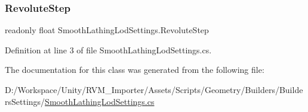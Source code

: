 \subsubsection{\texorpdfstring{RevoluteStep}{RevoluteStep}}
{\footnotesize\ttfamily readonly float Smooth\+Lathing\+Lod\+Settings.\+Revolute\+Step}



Definition at line 3 of file Smooth\+Lathing\+Lod\+Settings.\+cs.



The documentation for this class was generated from the following file\+:\begin{DoxyCompactItemize}
\item 
D\+:/\+Workspace/\+Unity/\+R\+V\+M\+\_\+\+Importer/\+Assets/\+Scripts/\+Geometry/\+Builders/\+Builders\+Settings/\mbox{\hyperlink{_smooth_lathing_lod_settings_8cs}{Smooth\+Lathing\+Lod\+Settings.\+cs}}\end{DoxyCompactItemize}
